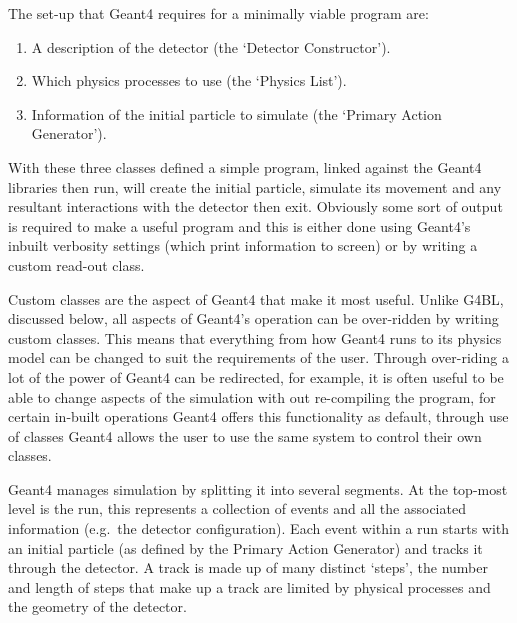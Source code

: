 The set-up that Geant4 requires for a minimally viable program are: 
\begin{enumerate}
  \item A description of the detector (the `Detector Constructor').
  \item Which physics processes to use (the `Physics List').
  \item Information of the initial particle to simulate (the `Primary Action Generator').
\end{enumerate}
With these three classes defined a simple program, linked against the Geant4 libraries then run, will create the initial particle, simulate its movement and any resultant interactions with the detector then exit. Obviously some sort of output is required to make a useful program and this is either done using Geant4's inbuilt verbosity settings (which print information to screen) or by writing a custom read-out class. 

Custom classes are the aspect of Geant4 that make it most useful. Unlike G4BL, discussed below, all aspects of Geant4's operation can be over-ridden by writing custom classes. This means that everything from how Geant4 runs to its physics model can be changed to suit the requirements of the user. Through over-riding a lot of the power of Geant4 can be redirected, for example, it is often useful to be able to change aspects of the simulation with out re-compiling the program, for certain in-built operations Geant4 offers this functionality as default, through use of classes Geant4 allows the user to use the same system to control their own classes.

Geant4 manages simulation by splitting it into several segments. At the top-most level is the run, this represents a collection of events and all the associated information (e.g.\ the detector configuration). Each event within a run starts with an initial particle (as defined by the Primary Action Generator) and tracks it through the detector. A track is made up of many distinct `steps', the number and length of steps that make up a track are limited by physical processes and the geometry of the detector. 

